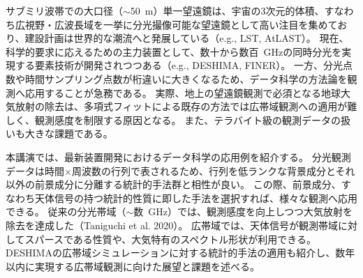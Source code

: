 \documentclass[ja]{2021a}
\begin{document}
サブミリ波帯での大口径（$\sim$50~m）単一望遠鏡は、宇宙の3次元的体積、すなわち広視野・広波長域を一挙に分光撮像可能な望遠鏡として高い注目を集めており、建設計画は世界的な潮流へと発展している（e.g., LST, AtLAST）。
現在、科学的要求に応えるための主力装置として、数十から数百~GHzの同時分光を実現する要素技術が開発されつつある（e.g., DESHIMA, FINER）。
一方、分光点数や時間サンプリング点数が桁違いに大きくなるため、データ科学の方法論を観測へ応用することが急務である。
実際、地上の望遠鏡観測で必須となる地球大気放射の除去は、多項式フィットによる既存の方法では広帯域観測への適用が難しく、観測感度を制限する原因となる。
また、テラバイト級の観測データの扱いも大きな課題である。

本講演では、最新装置開発におけるデータ科学の応用例を紹介する。
分光観測データは時間$\times$周波数の行列で表されるため、行列を低ランクな背景成分とそれ以外の前景成分に分離する統計的手法群と相性が良い。
この際、前景成分、すなわち天体信号の持つ統計的性質に即した手法を選択すれば、様々な観測へ応用できる。
従来の分光帯域（$\sim$数~GHz）では、観測感度を向上しつつ大気放射を除去を達成した（Taniguchi et al. 2020）。
広帯域では、天体信号が観測帯域に対してスパースである性質や、大気特有のスペクトル形状が利用できる。
DESHIMAの広帯域シミュレーションに対する統計的手法の適用も紹介し、数年以内に実現する広帯域観測に向けた展望と課題を述べる。
\end{document}
